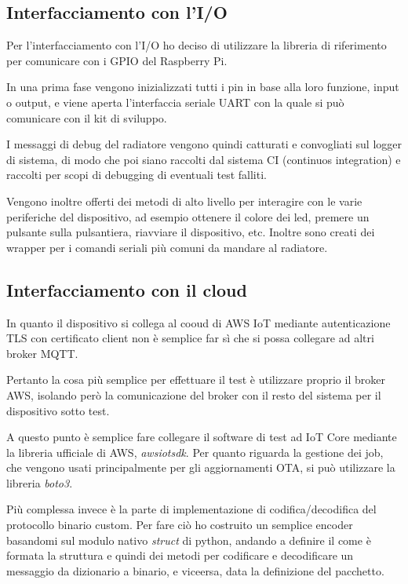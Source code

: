 \documentclass[12pt,a4paper,twoside,titlepage]{book}
\begin{document}
\subsection{Interfacciamento con l'I/O}

Per l'interfacciamento con l'I/O ho deciso di utilizzare la libreria di riferimento
per comunicare con i GPIO del Raspberry Pi.

In una prima fase vengono inizializzati tutti i pin in base alla loro funzione, input
o output, e viene aperta l'interfaccia seriale UART con la quale si può comunicare con
il kit di sviluppo.

I messaggi di debug del radiatore vengono quindi catturati e convogliati sul logger
di sistema, di modo che poi siano raccolti dal sistema CI (continuos integration)
e raccolti per scopi di debugging di eventuali test falliti.

Vengono inoltre offerti dei metodi di alto livello per interagire con le varie
periferiche del dispositivo, ad esempio ottenere il colore dei led, premere un
pulsante sulla pulsantiera, riavviare il dispositivo, etc.
Inoltre sono creati dei wrapper per i comandi seriali più comuni da mandare al
radiatore.

\subsection{Interfacciamento con il cloud}

In quanto il dispositivo si collega al cooud di AWS IoT mediante autenticazione
TLS con certificato client non è semplice far sì che si possa collegare ad altri
broker MQTT.

Pertanto la cosa più semplice per effettuare il test è utilizzare proprio il broker
AWS, isolando però la comunicazione del broker con il resto del sistema per il dispositivo
sotto test.

A questo punto è semplice fare collegare il software di test ad IoT Core mediante
la libreria ufficiale di AWS, \textit{awsiotsdk}. Per quanto riguarda la gestione
dei job, che vengono usati principalmente per gli aggiornamenti OTA, si può utilizzare
la libreria \textit{boto3}.

Più complessa invece è la parte di implementazione di codifica/decodifica del protocollo
binario custom. Per fare ciò ho costruito un semplice encoder basandomi sul modulo
nativo \textit{struct} di python, andando a definire il come è formata la struttura
e quindi dei metodi per codificare e decodificare un messaggio da dizionario a binario,
e viceersa, data la definizione del pacchetto.
\end{document}
